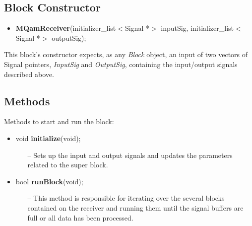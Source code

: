 %


\subsection*{Block Constructor}

\begin{itemize}
  \item \textbf{MQamReceiver}(initializer\_list$<$Signal *$>$ inputSig, initializer\_list$<$Signal *$>$ outputSig);
\end{itemize}
This block's constructor expects, as any \textit{Block} object, an input of two vectors of Signal pointers, \textit{InputSig} and \textit{OutputSig}, containing the input/output signals described above.


\subsection*{Methods}
Methods to start and run the block:
\begin{itemize}
     \item void \textbf{initialize}(void);
         \begin{itemize}
             \item[--] Sets up the input and output signals and updates the parameters related to the super block.
         \end{itemize}
     \item bool \textbf{runBlock}(void);
         \begin{itemize}
            \item[--] This method is responsible for iterating over the several blocks contained on the receiver and running them until the signal buffers are full or all data has been processed.
         \end{itemize}
\end{itemize}



